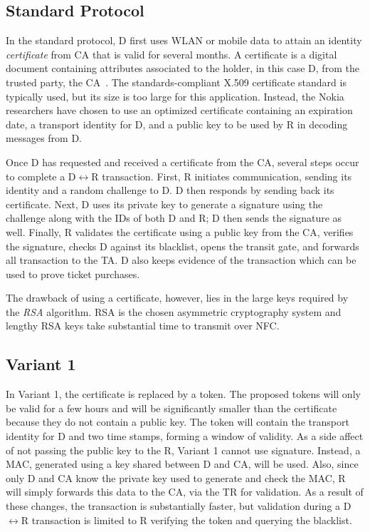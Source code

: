 \documentclass{sig-alternate}
\begin{document}
\subsection{Standard Protocol}
In the standard protocol, D first uses WLAN or mobile data to attain an identity \textit{certificate} from CA that is valid for several months. A certificate is a digital document containing attributes associated to the holder, in this case D, from the trusted party, the CA~\cite{crypto}. The standards-compliant X.509 certificate standard is typically used, but its size is too large for this application. Instead, the Nokia researchers have chosen to use an optimized certificate containing an expiration date, a transport identity for D, and a public key to be used by R in decoding messages from D. 
 
Once D has requested and received a certificate from the CA, several steps occur to complete a D$\leftrightarrow$R transaction. First, R initiates communication, sending its identity and a random challenge to D. D then responds by sending back its certificate. Next, D uses its private key to generate a signature using the challenge along with the IDs of both D and R; D then sends the signature as well. Finally, R validates the certificate using a public key from the CA, verifies the signature, checks D against its blacklist, opens the transit gate, and forwards all transaction to the TA. D also keeps evidence of the transaction which can be used to prove ticket purchases.

The drawback of using a certificate, however, lies in the large keys required by the \textit{RSA} algorithm. RSA is the chosen asymmetric cryptography system and lengthy RSA keys take substantial time to transmit over NFC.

\subsection{Variant 1}
In Variant 1, the certificate is replaced by a token. The proposed tokens will only be valid for a few hours and will be significantly smaller than the certificate because they do not contain a public key. The token will contain the transport identity for D and two time stamps, forming a window of validity. As a side affect of not passing the public key to the R, Variant 1 cannot use signature. Instead, a MAC, generated using a key shared between D and CA, will be used. Also, since only D and CA know the private key used to generate and check the MAC, R will simply forwards this data to the CA, via the TR for validation. As a result of these changes, the transaction is substantially faster, but validation during a D$\leftrightarrow$R transaction is limited to R verifying the token and querying the blacklist.
\end{document}

